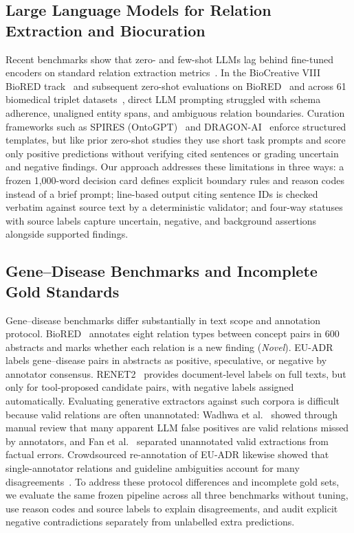 \documentclass[preprint,10pt,letterpaper]{elsarticle}
\begin{document}
\subsection{Large Language Models for Relation Extraction and Biocuration}
Recent benchmarks show that zero- and few-shot LLMs lag behind fine-tuned encoders on standard relation extraction metrics~\cite{chen2025benchmarking,islamaj2024biocreative,brokman2025benchmark,gade2025benchmarking}. In the BioCreative VIII BioRED track~\cite{islamaj2024biocreative} and subsequent zero-shot evaluations on BioRED~\cite{brokman2025benchmark} and across 61 biomedical triplet datasets~\cite{gade2025benchmarking}, direct LLM prompting struggled with schema adherence, unaligned entity spans, and ambiguous relation boundaries. Curation frameworks such as SPIRES (OntoGPT)~\cite{caufield2024spires} and DRAGON-AI~\cite{toro2024dragonai} enforce structured templates, but like prior zero-shot studies they use short task prompts and score only positive predictions without verifying cited sentences or grading uncertain and negative findings. Our approach addresses these limitations in three ways: a frozen 1,000-word decision card defines explicit boundary rules and reason codes instead of a brief prompt; line-based output citing sentence IDs is checked verbatim against source text by a deterministic validator; and four-way statuses with source labels capture uncertain, negative, and background assertions alongside supported findings.

\subsection{Gene--Disease Benchmarks and Incomplete Gold Standards}
Gene--disease benchmarks differ substantially in text scope and annotation protocol. BioRED~\cite{luo2022biored} annotates eight relation types between concept pairs in 600 abstracts and marks whether each relation is a new finding (\emph{Novel}). EU-ADR~\cite{vanmulligen2012euadr} labels gene--disease pairs in abstracts as positive, speculative, or negative by annotator consensus. RENET2~\cite{su2021renet2} provides document-level labels on full texts, but only for tool-proposed candidate pairs, with negative labels assigned automatically. Evaluating generative extractors against such corpora is difficult because valid relations are often unannotated: Wadhwa et al.~\cite{wadhwa2023revisiting} showed through manual review that many apparent LLM false positives are valid relations missed by annotators, and Fan et al.~\cite{fan2024evaluating} separated unannotated valid extractions from factual errors. Crowdsourced re-annotation of EU-ADR likewise showed that single-annotator relations and guideline ambiguities account for many disagreements~\cite{li2015crowdsourcing}. To address these protocol differences and incomplete gold sets, we evaluate the same frozen pipeline across all three benchmarks without tuning, use reason codes and source labels to explain disagreements, and audit explicit negative contradictions separately from unlabelled extra predictions.
\end{document}
